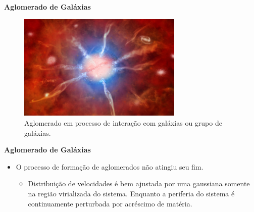 \documentclass[xcolor=dvipsnames,10pt]{beamer}
\begin{document}
\begin{frame}{\textbf{Aglomerado de Galáxias}}
 \begin{figure}[!htbp] %
    \begin{center}
    \includegraphics[height=0.5\textheight,width=0.7\textwidth]{resultados/formation.jpg}%
    \caption{\scriptsize{Aglomerado em processo de interação com galáxias ou grupo de galáxias.}}
    \end{center}
  \end{figure} 
\end{frame}

\begin{frame}{\textbf{Aglomerado de Galáxias}}
\begin{itemize}
\item O processo de formação de aglomerados não atingiu seu fim.
\begin{itemize}
\item Distribuição de velocidades é bem ajustada por uma gaussiana somente na região virializada do sistema. Enquanto a periferia do sistema é continuamente perturbada por acréscimo de matéria.
\end{itemize}
\end{itemize}
\end{frame}
\end{document}
